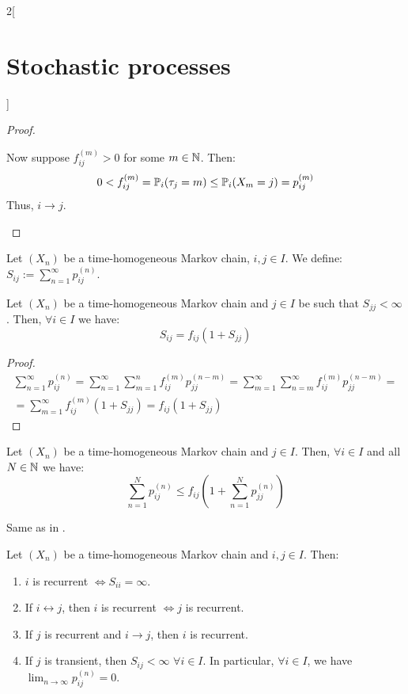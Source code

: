 \documentclass[../../../main_math.tex]{subfiles}
\begin{document}
\begin{multicols}{2}[\section{Stochastic processes}]
\begin{proof}
\begin{itemizeiff}
      \item Now suppose $f_{ij}^{(m)}>0$ for some $m\in\mathbb{N}$. Then:
      $$
        0<f_{ij}^{(m)}=\mathbb{P}_i(\tau_j=m)\leq \mathbb{P}_i(X_m=j)=p_{ij}^{(m)}
      $$
      Thus, $i\to j$.
    \end{itemizeiff}
  \end{proof}
  \begin{definition}
    Let $(X_n)$ be a time-homogeneous Markov chain, $i, j\in I$. We define: $S_{ij}:=\sum_{n=1}^{\infty}p_{ij}^{(n)}$.
  \end{definition}
  \begin{lemma}\label{SP:lemaPrerec}
    Let $(X_n)$ be a time-homogeneous Markov chain and $j\in I$ be such that $S_{jj}<\infty$. Then, $\forall i\in I$ we have:
    $$
      S_{ij}=f_{ij}(1+S_{jj})
    $$
  \end{lemma}
  \begin{proof}
    \begin{multline*}
      \sum_{n=1}^\infty p_{ij}^{(n)}= \sum_{n=1}^\infty \sum_{m=1}^n f_{ij}^{(m)}p_{jj}^{(n-m)}=\sum_{m=1}^\infty \sum_{n=m}^\infty f_{ij}^{(m)}p_{jj}^{(n-m)}=\\=\sum_{m=1}^\infty f_{ij}^{(m)}(1+S_{jj})=f_{ij}(1+S_{jj})
    \end{multline*}
  \end{proof}
  \begin{lemma}\label{SP:lemaPrerec2}
    Let $(X_n)$ be a time-homogeneous Markov chain and $j\in I$. Then, $\forall i\in I$ and all $N\in\mathbb{N}$ we have:
    $$
      \sum_{n=1}^Np_{ij}^{(n)}\leq f_{ij}\left(1+\sum_{n=1}^Np_{jj}^{(n)}\right)
    $$
  \end{lemma}
  \begin{sproof}
    Same as in .
  \end{sproof}
  \begin{theorem}
    Let $(X_n)$ be a time-homogeneous Markov chain and $i,j\in I$. Then:
    \begin{enumerate}
      \item\label{thmRecA} $i$ is recurrent $\iff S_{ii}=\infty$.
      \item\label{thmRecB} If $i\leftrightarrow j$, then $i$ is recurrent $\iff j$ is recurrent.
      \item\label{thmRecC} If $j$ is recurrent and $i\to j$, then $i$ is recurrent.
      \item\label{thmRecD} If $j$ is transient, then $S_{ij}<\infty$ $\forall i\in I$. In particular, $\forall i\in I$, we have $\displaystyle \lim_{n\to\infty}p_{ij}^{(n)}=0$.

\end{enumerate}
\end{theorem}
\end{multicols}
\end{document}

